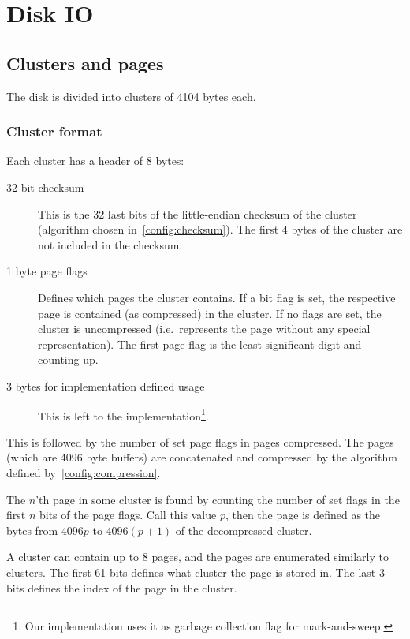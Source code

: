 \documentclass[11pt,a4paper]{report}
\newcommand{\clustersize}{4104 }
\newcommand{\pagesize}{4096 }
\begin{document}
    \chapter{Disk IO}

    \section{Clusters and pages}
        The disk is divided into clusters of \clustersize bytes each.

        \subsection{Cluster format}
        Each cluster has a header of 8 bytes:

        \begin{description}
            \item [32-bit checksum] This is the 32 last bits of the
                little-endian checksum of the cluster (algorithm
                chosen in~\ref{config:checksum}). The first 4 bytes of
                the cluster are not included in the checksum.
            \item [1 byte page flags] Defines which pages the cluster contains.
                If a bit flag is set, the respective page is contained (as
                compressed) in the cluster. If no flags are set, the cluster is
                uncompressed (i.e.\ represents the page without any special
                representation). The first page flag is the least-significant
                digit and counting up.
            \item [3 bytes for implementation defined usage] This is
                left to the implementation\footnote{Our implementation
                uses it as garbage collection flag for mark-and-sweep.}.
        \end{description}

        This is followed by the number of set page flags in pages compressed.
        The pages (which are \pagesize byte buffers) are concatenated and
        compressed by the algorithm defined by~\ref{config:compression}.

        The $n$'th page in some cluster is found by counting the number of set
        flags in the first $n$ bits of the page flags. Call this value $p$,
        then the page is defined as the bytes from $\pagesize p$ to $\pagesize
        (p + 1)$ of the decompressed cluster.

        A cluster can contain up to 8 pages, and the pages are enumerated
        similarly to clusters. The first 61 bits defines what cluster the page
        is stored in. The last 3 bits defines the index of the page in the
        cluster.
\end{document}
